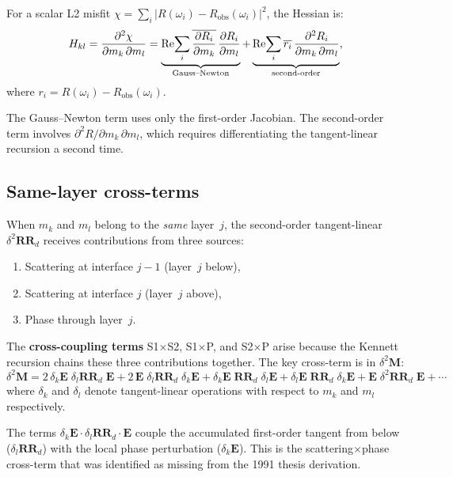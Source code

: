 \documentclass[11pt,a4paper]{article}
\newcommand{\RR}{\mathbf{RR}}
\newcommand{\vE}{\mathbf{E}}
\newcommand{\vM}{\mathbf{M}}
\newcommand{\ppd}[2]{\frac{\partial #1}{\partial #2}}
\theoremstyle{plain}
\theoremstyle{remark}
\begin{document}
For a scalar L2 misfit $\chi = \sum_i |R(\omega_i) - R_{\text{obs}}(\omega_i)|^2$,
the Hessian is:
\begin{equation}\label{eq:hessian}
  H_{kl}
  = \ppd{{}^2\chi}{m_k\,\partial m_l}
  = \underbrace{%
    \operatorname{Re}\!\sum_i
    \overline{\ppd{R_i}{m_k}}\,\ppd{R_i}{m_l}
  }_{\text{Gauss--Newton}}
  + \underbrace{%
    \operatorname{Re}\!\sum_i
    \overline{r_i}\,\ppd{{}^2 R_i}{m_k\,\partial m_l}
  }_{\text{second-order}},
\end{equation}
where $r_i = R(\omega_i) - R_{\text{obs}}(\omega_i)$.

The Gauss--Newton term uses only the first-order Jacobian.  The second-order
term involves $\partial^2 R/\partial m_k\,\partial m_l$, which requires
differentiating the tangent-linear recursion a second time.

\subsection{Same-layer cross-terms}\label{sec:crossterms}

When $m_k$ and $m_l$ belong to the \emph{same} layer~$j$, the second-order
tangent-linear $\delta^2\RR_d$ receives contributions from three sources:
\begin{enumerate}[nosep]
  \item[\textbf{S1}:] Scattering at interface $j{-}1$ (layer~$j$ below),
  \item[\textbf{S2}:] Scattering at interface $j$ (layer~$j$ above),
  \item[\textbf{P}:]  Phase through layer~$j$.
\end{enumerate}

The \textbf{cross-coupling terms} S1$\times$S2, S1$\times$P, and
S2$\times$P arise because the Kennett recursion chains these three
contributions together.  The key cross-term is in $\delta^2\vM$:
\begin{equation}\label{eq:d2M}
  \delta^2\vM
  = 2\,\delta_k\vE\;\delta_l\RR_d\;\vE
  + 2\,\vE\;\delta_l\RR_d\;\delta_k\vE
  + \delta_k\vE\;\RR_d\;\delta_l\vE
  + \delta_l\vE\;\RR_d\;\delta_k\vE
  + \vE\;\delta^2\RR_d\;\vE
  + \dotsb
\end{equation}
where $\delta_k$ and $\delta_l$ denote tangent-linear operations with respect
to $m_k$ and $m_l$ respectively.

The terms $\delta_k\vE\cdot\delta_l\RR_d\cdot\vE$ couple the accumulated
first-order tangent from below ($\delta_l\RR_d$) with the local phase
perturbation ($\delta_k\vE$).  This is the scattering$\times$phase cross-term
that was identified as missing from the 1991 thesis derivation.
\end{document}
